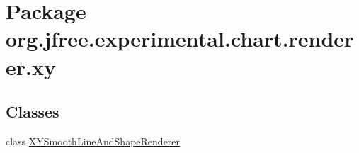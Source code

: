 \hypertarget{namespaceorg_1_1jfree_1_1experimental_1_1chart_1_1renderer_1_1xy}{}\section{Package org.\+jfree.\+experimental.\+chart.\+renderer.\+xy}
\label{namespaceorg_1_1jfree_1_1experimental_1_1chart_1_1renderer_1_1xy}
\subsection*{Classes}
\begin{DoxyCompactItemize}
\item 
class \mbox{\hyperlink{classorg_1_1jfree_1_1experimental_1_1chart_1_1renderer_1_1xy_1_1_x_y_smooth_line_and_shape_renderer}{X\+Y\+Smooth\+Line\+And\+Shape\+Renderer}}
\end{DoxyCompactItemize}
